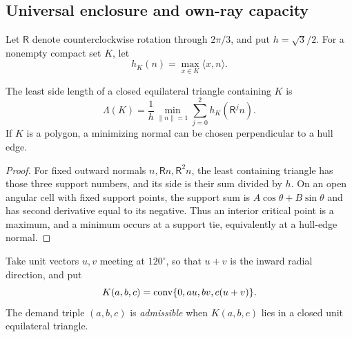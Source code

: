 \subsection{Universal enclosure and own-ray capacity}
\label{subsec:direct-local-calculus}

Let $\mathsf R$ denote counterclockwise rotation through $2\pi/3$, and put
$h=\sqrt3/2$.  For a nonempty compact set $K$, let
\[
 h_K(n)=\max_{x\in K}\langle x,n\rangle .
\]

\begin{proposition}
\label{prop:new-enclosure-gauge}
\label{prop:universal-enclosure-gauge}
The least side length of a closed equilateral triangle containing $K$ is
\[
 \Lambda(K)=\frac1h\min_{\lVert n\rVert=1}
 \sum_{j=0}^2h_K(\mathsf R^jn).
 \tag{6.1}
\]
If $K$ is a polygon, a minimizing normal can be chosen perpendicular to a
hull edge.
\end{proposition}

\begin{proof}
For fixed outward normals $n,\mathsf Rn,\mathsf R^2n$, the least containing
triangle has those three support numbers, and its side is their sum divided
by $h$.  On an open angular cell with fixed support points, the support sum is
$A\cos\theta+B\sin\theta$ and has second derivative equal to its negative.
Thus an interior critical point is a maximum, and a minimum occurs at a
support tie, equivalently at a hull-edge normal.
\end{proof}

Take unit vectors $u,v$ meeting at $120^\circ$, so that $u+v$ is the inward
radial direction, and put
\[
 K(a,b,c)=\mathrm{conv}\{0,au,bv,c(u+v)\}.
\]
The demand triple $(a,b,c)$ is \emph{admissible} when $K(a,b,c)$ lies in a
closed unit equilateral triangle.

